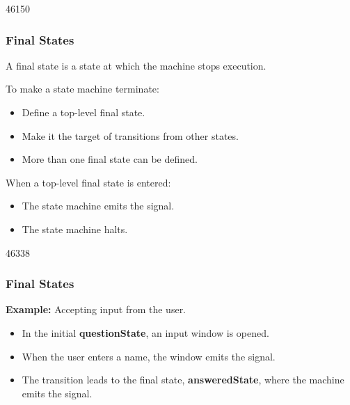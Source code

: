 \begin{slide}{46150}\frametitle{Final States}
\vspace*{1.0em}
A final state is a state at which the machine stops execution.

\vspace*{0.5em}
To make a state machine terminate:
\begin{itemize}
\item Define a top-level final state.
\item Make it the target of transitions from other states.
\item More than one final state can be defined.
\end{itemize}

\vspace*{0.5em}
When a top-level final state is entered:
\begin{itemize}
\item The state machine emits the  signal.
\item The state machine halts.
\end{itemize}

\end{slide}

\begin{slide}{46338}\frametitle{Final States}
\textbf{Example:} Accepting input from the user.

\vspace*{1.25em}
\vspace*{1.5em}

\begin{itemize}
\item In the initial \textbf{questionState}, an input window is opened.
\item When the user enters a name, the window emits the 
signal.
\item The transition leads to the final state, \textbf{answeredState}, where
the machine emits the  signal.
\end{itemize}
\end{slide}

